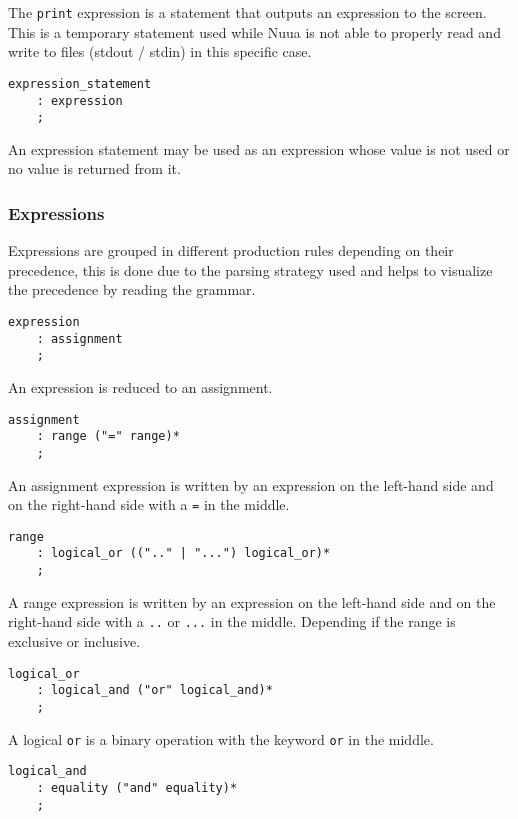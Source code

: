 The \texttt{print} expression is a statement that outputs an expression to the screen. This is a temporary statement used while
Nuua is not able to properly read and write to files (stdout / stdin) in this specific case.

\begin{lstlisting}
expression_statement
    : expression
    ;
\end{lstlisting}

An expression statement may be used as an expression whose value is not used or no value is returned from it.

\subsubsection{Expressions}
\label{sec:grammar_expressions}

Expressions are grouped in different production rules depending on their precedence, this is done due to the parsing strategy used and
helps to visualize the precedence by reading the grammar.

\begin{lstlisting}
expression
    : assignment
    ;
\end{lstlisting}

An expression is reduced to an assignment.

\begin{lstlisting}
assignment
    : range ("=" range)*
    ;
\end{lstlisting}

An assignment expression is written by an expression on the left-hand side and on the right-hand side with a \texttt{=} in the middle.

\begin{lstlisting}
range
    : logical_or ((".." | "...") logical_or)*
    ;
\end{lstlisting}

A range expression is written by an expression on the left-hand side and on the right-hand side with a \texttt{..} or \texttt{...} in the middle. Depending
if the range is exclusive or inclusive.

\begin{lstlisting}
logical_or
    : logical_and ("or" logical_and)*
    ;
\end{lstlisting}

A logical \texttt{or} is a binary operation with the keyword \texttt{or} in the middle.

\begin{lstlisting}
logical_and
    : equality ("and" equality)*
    ;
\end{lstlisting}

